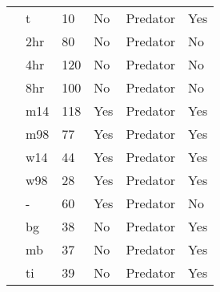 \begin{longtable}{llllll}
\citet{Vahl:2005aa}&t&10&No&Predator&Yes\tabularnewline
\citet{Von-Westernhagen:1976aa}&2hr&80&No&Predator&No\tabularnewline
\citet{Von-Westernhagen:1976aa}&4hr&120&No&Predator&No\tabularnewline
\citet{Von-Westernhagen:1976aa}&8hr&100&No&Predator&No\tabularnewline
\citet{Vucetich:2002aa}&m14&118&Yes&Predator&Yes\tabularnewline
\citet{Vucetich:2002aa}&m98&77&Yes&Predator&Yes\tabularnewline
\citet{Vucetich:2002aa}&w14&44&Yes&Predator&Yes\tabularnewline
\citet{Vucetich:2002aa}&w98&28&Yes&Predator&Yes\tabularnewline
\citet{Walde:1984aa}&-&60&Yes&Predator&No\tabularnewline
\citet{Wasserman:2016aa}&bg&38&No&Predator&Yes\tabularnewline
\citet{Wasserman:2016aa}&mb&37&No&Predator&Yes\tabularnewline
\citet{Wasserman:2016aa}&ti&39&No&Predator&Yes\tabularnewline
\hline
\end{longtable}
